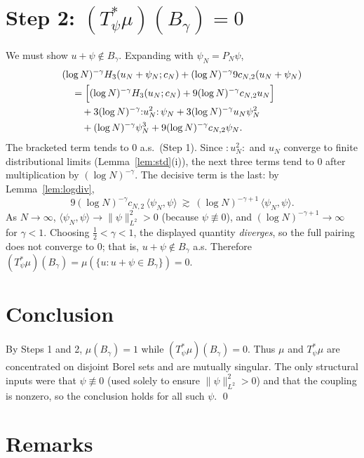 \documentclass[11pt]{article}
\newcommand{\Hp}{H}      %
\newcommand{\PN}{P_N}
\begin{document}
\section*{Step 2: $(T_\psi^*\mu)(B_\gamma)=0$}

We must show $u+\psi\notin B_\gamma$. Expanding with $\psi_N=\PN\psi$,
\begin{align*}
&(\log N)^{-\gamma}\Hp_3(u_N+\psi_N;c_N)+(\log N)^{-\gamma}9c_{N,2}(u_N+\psi_N)\\
&\quad=\Bigl[(\log N)^{-\gamma}\Hp_3(u_N;c_N)+9(\log N)^{-\gamma}c_{N,2}u_N\Bigr]\\
&\qquad+3(\log N)^{-\gamma}{:}u_N^2{:}\,\psi_N+3(\log N)^{-\gamma}u_N\psi_N^2\\
&\qquad+(\log N)^{-\gamma}\psi_N^3+9(\log N)^{-\gamma}c_{N,2}\psi_N.
\end{align*}
The bracketed term tends to $0$ a.s.\ (Step 1). Since ${:}u_N^2{:}$ and $u_N$
converge to finite distributional limits (Lemma~\ref{lem:std}(i)), the next three
terms tend to $0$ after multiplication by $(\log N)^{-\gamma}$. The decisive term
is the last: by Lemma~\ref{lem:logdiv},
\[
9(\log N)^{-\gamma}c_{N,2}\,\langle\psi_N,\psi\rangle\ \gtrsim\ (\log N)^{-\gamma+1}\,\langle\psi_N,\psi\rangle .
\]
As $N\to\infty$, $\langle\psi_N,\psi\rangle\to\|\psi\|_{L^2}^2>0$ (because
$\psi\not\equiv0$), and $(\log N)^{-\gamma+1}\to\infty$ for $\gamma<1$. Choosing
$\tfrac12<\gamma<1$, the displayed quantity \emph{diverges}, so the full pairing
does not converge to $0$; that is, $u+\psi\notin B_\gamma$ a.s. Therefore
$(T_\psi^*\mu)(B_\gamma)=\mu(\{u:u+\psi\in B_\gamma\})=0$.

\section*{Conclusion}

By Steps 1 and 2, $\mu(B_\gamma)=1$ while $(T_\psi^*\mu)(B_\gamma)=0$. Thus $\mu$
and $T_\psi^*\mu$ are concentrated on disjoint Borel sets and are mutually
singular. The only structural inputs were that $\psi\not\equiv0$ (used solely to
ensure $\|\psi\|_{L^2}^2>0$) and that the coupling is nonzero, so the conclusion
holds for all such $\psi$. \qed

\section*{Remarks}
\end{document}
